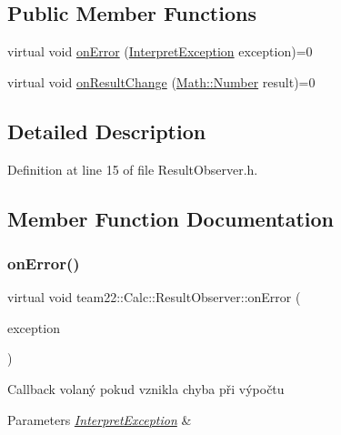 \subsection*{Public Member Functions}
\begin{DoxyCompactItemize}
\item 
virtual void \hyperlink{classteam22_1_1_calc_1_1_result_observer_ad36cf8df89853d60f91094800c01d329}{on\+Error} (\hyperlink{class_interpret_exception}{Interpret\+Exception} exception)=0
\item 
virtual void \hyperlink{classteam22_1_1_calc_1_1_result_observer_aa04007df3aa8a499c3a511f549238285}{on\+Result\+Change} (\hyperlink{classteam22_1_1_math_1_1_number}{Math\+::\+Number} result)=0
\end{DoxyCompactItemize}


\subsection{Detailed Description}


Definition at line 15 of file Result\+Observer.\+h.



\subsection{Member Function Documentation}
\mbox{\label{classteam22_1_1_calc_1_1_result_observer_ad36cf8df89853d60f91094800c01d329}} 
\subsubsection{\texorpdfstring{on\+Error()}{onError()}}
{\footnotesize\ttfamily virtual void team22\+::\+Calc\+::\+Result\+Observer\+::on\+Error (\begin{DoxyParamCaption}\item[{\hyperlink{class_interpret_exception}{Interpret\+Exception}}]{exception }\end{DoxyParamCaption})\hspace{0.3cm}{\ttfamily [pure virtual]}}

Callback volaný pokud vznikla chyba při výpočtu 
\begin{DoxyParams}{Parameters}
{\em \hyperlink{class_interpret_exception}{Interpret\+Exception}} & \\
\hline
\end{DoxyParams}



